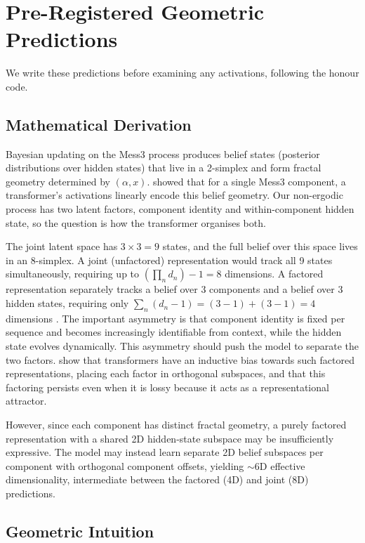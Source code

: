 \documentclass{article}
\begin{document}
\section{Pre-Registered Geometric Predictions}

We write these predictions before examining any activations, following the honour code.

\subsection{Mathematical Derivation}

Bayesian updating on the Mess3 process produces belief states (posterior distributions over hidden states) that live in a 2-simplex and form fractal geometry determined by $(\alpha, x)$. \citet{shai2024} showed that for a single Mess3 component, a transformer's activations linearly encode this belief geometry. Our non-ergodic process has two latent factors, component identity and within-component hidden state, so the question is how the transformer organises both.

The joint latent space has $3 \times 3 = 9$ states, and the full belief over this space lives in an 8-simplex. A joint (unfactored) representation would track all 9 states simultaneously, requiring up to $(\prod_n d_n) - 1 = 8$ dimensions. A factored representation separately tracks a belief over 3 components and a belief over 3 hidden states, requiring only $\sum_n (d_n - 1) = (3-1) + (3-1) = 4$ dimensions \citep{shai2026}. The important asymmetry is that component identity is fixed per sequence and becomes increasingly identifiable from context, while the hidden state evolves dynamically. This asymmetry should push the model to separate the two factors. \citet{shai2026} show that transformers have an inductive bias towards such factored representations, placing each factor in orthogonal subspaces, and that this factoring persists even when it is lossy because it acts as a representational attractor.

However, since each component has distinct fractal geometry, a purely factored representation with a shared 2D hidden-state subspace may be insufficiently expressive. The model may instead learn separate 2D belief subspaces per component with orthogonal component offsets, yielding $\sim$6D effective dimensionality, intermediate between the factored (4D) and joint (8D) predictions.

\subsection{Geometric Intuition}
\end{document}
